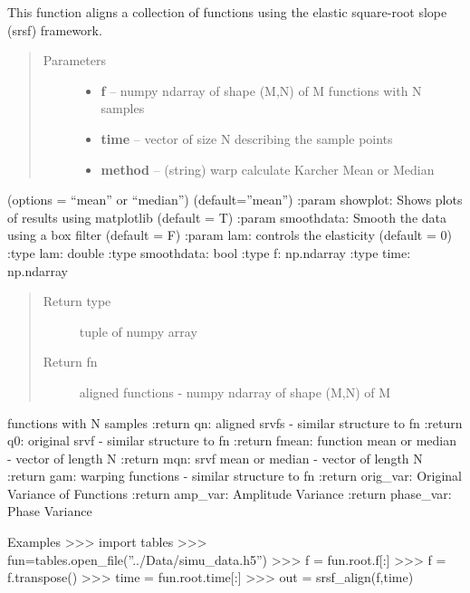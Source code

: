 \documentclass[letterpaper,10pt,english]{sphinxmanual}
\begin{document}

\begin{fulllineitems}
\label{time_warping:time_warping.srsf_align}
This function aligns a collection of functions using the elastic
square-root slope (srsf) framework.
\begin{quote}\begin{description}
\item[{Parameters}] \leavevmode\begin{itemize}
\item {} 
\textbf{f} -- numpy ndarray of shape (M,N) of M functions with N samples

\item {} 
\textbf{time} -- vector of size N describing the sample points

\item {} 
\textbf{method} -- (string) warp calculate Karcher Mean or Median

\end{itemize}

\end{description}\end{quote}

(options = ``mean'' or ``median'') (default=''mean'')
:param showplot: Shows plots of results using matplotlib (default = T)
:param smoothdata: Smooth the data using a box filter (default = F)
:param lam: controls the elasticity (default = 0)
:type lam: double
:type smoothdata: bool
:type f: np.ndarray
:type time: np.ndarray
\begin{quote}\begin{description}
\item[{Return type}] \leavevmode
tuple of numpy array

\item[{Return fn}] \leavevmode
aligned functions - numpy ndarray of shape (M,N) of M

\end{description}\end{quote}

functions with N samples
:return qn: aligned srvfs - similar structure to fn
:return q0: original srvf - similar structure to fn
:return fmean: function mean or median - vector of length N
:return mqn: srvf mean or median - vector of length N
:return gam: warping functions - similar structure to fn
:return orig\_var: Original Variance of Functions
:return amp\_var: Amplitude Variance
:return phase\_var: Phase Variance

Examples
\textgreater{}\textgreater{}\textgreater{} import tables
\textgreater{}\textgreater{}\textgreater{} fun=tables.open\_file(''../Data/simu\_data.h5'')
\textgreater{}\textgreater{}\textgreater{} f = fun.root.f{[}:{]}
\textgreater{}\textgreater{}\textgreater{} f = f.transpose()
\textgreater{}\textgreater{}\textgreater{} time = fun.root.time{[}:{]}
\textgreater{}\textgreater{}\textgreater{} out = srsf\_align(f,time)

\end{fulllineitems}
\end{document}
